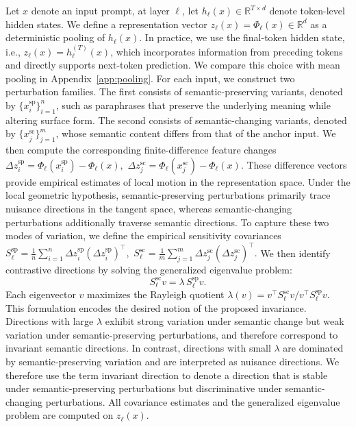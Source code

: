 Let \(x\) denote an input prompt, at layer $\ell$, let $h_\ell(x) \in \mathbb{R}^{T \times d}$ denote token-level hidden states. We define a representation vector $z_\ell(x)=\Phi_\ell(x)\in\mathbb{R}^d$ as a deterministic pooling of $h_\ell(x)$. 
In practice, we use the final-token hidden state, i.e., $z_\ell(x)=h_\ell^{(T)}(x)$, which incorporates information from preceding tokens and directly supports next-token prediction. We compare this choice with mean pooling in Appendix~\ref{app:pooling}.
For each input, we construct two perturbation families. The first consists of semantic-preserving variants, denoted by \(\{x_i^{\mathrm{sp}}\}_{i=1}^{n}\), such as paraphrases that preserve the underlying meaning while altering surface form. The second consists of semantic-changing variants, denoted by \(\{x_j^{\mathrm{sc}}\}_{j=1}^{m}\), whose semantic content differs from that of the anchor input. We then compute the corresponding finite-difference feature changes
\(
\Delta z_i^{\mathrm{sp}}=\Phi_\ell(x_i^{\mathrm{sp}})-\Phi_\ell(x),
\)
\(
\Delta z_j^{\mathrm{sc}}=\Phi_\ell(x_j^{\mathrm{sc}})-\Phi_\ell(x).
\)
These difference vectors provide empirical estimates of local motion in the representation space. Under the local geometric hypothesis, semantic-preserving perturbations primarily trace nuisance directions in the tangent space, whereas semantic-changing perturbations additionally traverse semantic directions. To capture these two modes of variation, we define the empirical sensitivity covariances
\(
S_{\ell}^{\mathrm{sp}}=
\frac{1}{n}\sum_{i=1}^{n}\Delta z_i^{\mathrm{sp}}(\Delta z_i^{\mathrm{sp}})^\top,
\)
\(
S_{\ell}^{\mathrm{sc}}=
\frac{1}{m}\sum_{j=1}^{m}\Delta z_j^{\mathrm{sc}}(\Delta z_j^{\mathrm{sc}})^\top.
\) 
We then identify contrastive directions by solving the generalized eigenvalue problem:
\begin{equation}
   S_{\ell}^{\mathrm{sc}} v = \lambda \, S_{\ell}^{\mathrm{sp}} v. 
\label{eq: cross_eigen}
\end{equation}
Each eigenvector \(v\) maximizes the Rayleigh quotient
\(
\lambda(v)=
v^\top S_{\ell}^{\mathrm{sc}} v / v^\top S_{\ell}^{\mathrm{sp}} v.
\)
This formulation encodes the desired notion of the proposed invariance. 
Directions with large \(\lambda\) exhibit strong variation under semantic change but weak variation under semantic-preserving perturbations, and therefore correspond to invariant semantic directions. In contrast, directions with small \(\lambda\) are dominated by semantic-preserving variation and are interpreted as nuisance directions. 
We therefore use the term invariant direction to denote a direction that is stable under semantic-preserving perturbations but discriminative under semantic-changing perturbations. 
All covariance estimates and the generalized eigenvalue problem are computed on $z_\ell(x)$.

